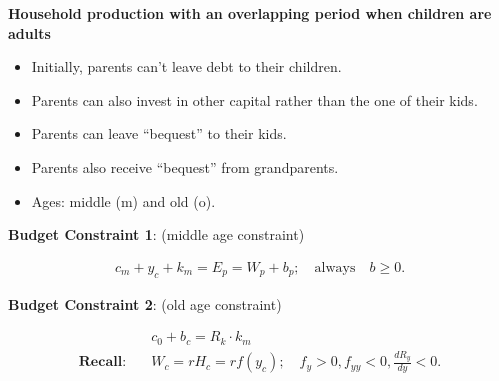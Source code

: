 \documentclass[14pt,notitlepage]{article}
\begin{document}
\textbf{Household production with an overlapping period when children are adults}

\begin{itemize}
\item Initially, parents can't leave debt to their children.
\item Parents can also invest in other capital rather than the one of their kids.
\item Parents can leave ``bequest'' to their kids.
\item Parents also receive ``bequest'' from grandparents.
\item Ages: middle (m) and old (o).
\end{itemize}

\textbf{Budget Constraint 1}: (middle age constraint)

\begin{align*}
c_m + y_c + k_m = E_p = W_p + b_p; \quad \text{always} \quad b \geq 0.
\end{align*}

\textbf{Budget Constraint 2}: (old age constraint)

\begin{align*}
&c_0 + b_c = R_k \cdot k_m \\
\textbf{Recall}: \quad &W_c = r H_c = r f(y_c); \quad f_y > 0, f_{yy} < 0, \frac{dR_y}{dy} < 0.
\end{align*}
\end{document}
